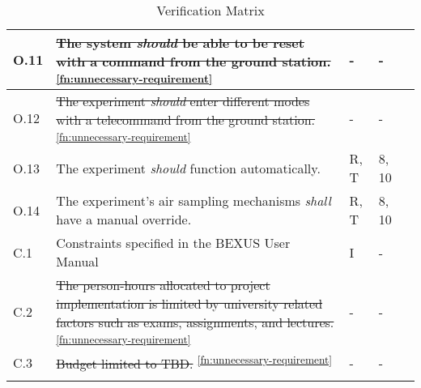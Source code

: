 \begin{longtable}[]{|m{}| m{} |m{} |m{}|m{}|}
O.11 & \st{The system \textit{should} be able to be reset with a command from the ground station.}\textsuperscript{\ref{fn:unnecessary-requirement}}                                                                                &     -      & -            &        \\ \hline
O.12 & \st{The experiment \textit{should} enter different modes with a telecommand from the ground station.}\textsuperscript{\ref{fn:unnecessary-requirement}}                                                                      &      -        & -    &        \\ \hline
O.13 & The experiment \textit{should} function automatically.                                                           &      R, T        & 8, 10            &        \\ \hline
O.14 & The experiment's air sampling mechanisms \textit{shall} have a manual override.                                                           &      R, T        & 8, 10            &        \\ \hline
C.1  & Constraints specified in the BEXUS User Manual                                                                                                                          &       I       & -            &        \\ \hline
C.2  & \st{The person-hours allocated to project implementation is limited by university related factors such as exams, assignments, and lectures.} \textsuperscript{\ref{fn:unnecessary-requirement}}                                &      -        & -            &        \\ \hline
C.3  & \st{Budget limited to TBD.} \textsuperscript{\ref{fn:unnecessary-requirement}}                                                                                                                                                 &      -        & -            &        \\ \hline

\caption{Verification Matrix}
\label{tab:var-mat}
\end{longtable}
\raggedbottom